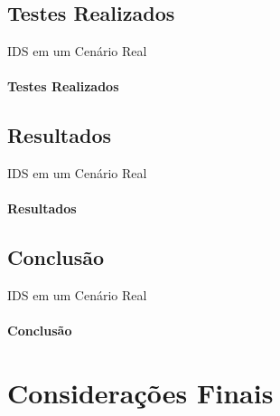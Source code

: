 \documentclass[aspectratio=169]{beamer}
\begin{document}
\subsection{Testes Realizados}
\begin{frame}{IDS em um Cenário Real}
    \framesubtitle{Testes Realizados}
\end{frame}
\subsection{Resultados}
\begin{frame}{IDS em um Cenário Real}
    \framesubtitle{Resultados}
\end{frame}
\subsection{Conclusão}
\begin{frame}{IDS em um Cenário Real}
    \framesubtitle{Conclusão}
\end{frame}
\section{Considerações Finais}
\begin{frame}
\end{frame}
\end{document}
